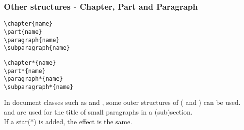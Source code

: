 \begin{frame}[fragile]
	\frametitle{Other structures - Chapter, Part and Paragraph}
	\begin{command}
	\begin{multicols}{2}
		\begin{verbatim}
\chapter{name}
\part{name}
\paragraph{name}
\subparagraph{name}
		\end{verbatim}
		\begin{verbatim}
\chapter*{name}
\part*{name}
\paragraph*{name}
\subparagraph*{name}
		\end{verbatim}
	\end{multicols}
	\end{command}
	In document classes such as  and , some outer structures of  (\LC{\chapter} and \LC{\part}) can be used. \\
	\LC{\paragraph} and \LC{\subparagraph} are used for the title of small paragraphs in a (sub)section.\\
	If a star(\alert{*}) is added, the effect is the same.\\
\end{frame}

